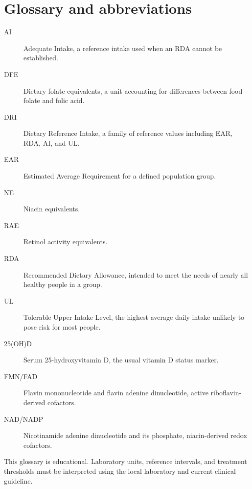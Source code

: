 \chapter*{Glossary and abbreviations}

\begin{description}
\item[AI] Adequate Intake, a reference intake used when an RDA cannot be established.
\item[DFE] Dietary folate equivalents, a unit accounting for differences between food folate and folic acid.
\item[DRI] Dietary Reference Intake, a family of reference values including EAR, RDA, AI, and UL.
\item[EAR] Estimated Average Requirement for a defined population group.
\item[NE] Niacin equivalents.
\item[RAE] Retinol activity equivalents.
\item[RDA] Recommended Dietary Allowance, intended to meet the needs of nearly all healthy people in a group.
\item[UL] Tolerable Upper Intake Level, the highest average daily intake unlikely to pose risk for most people.
\item[25(OH)D] Serum 25-hydroxyvitamin D, the usual vitamin D status marker.
\item[FMN/FAD] Flavin mononucleotide and flavin adenine dinucleotide, active riboflavin-derived cofactors.
\item[NAD/NADP] Nicotinamide adenine dinucleotide and its phosphate, niacin-derived redox cofactors.
\end{description}

This glossary is educational. Laboratory units, reference intervals, and treatment thresholds must be interpreted using the local laboratory and current clinical guideline.
